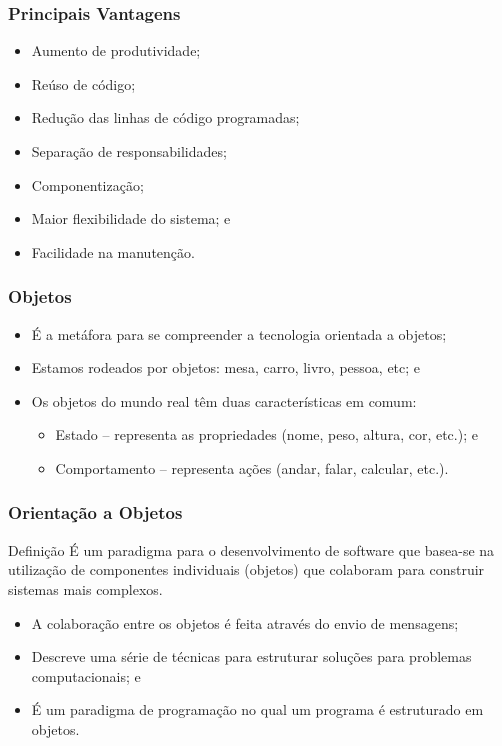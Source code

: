 \documentclass{beamer}
\begin{document}
\begin{frame}
	\frametitle{Principais Vantagens}
	
	\begin{itemize}
		\item Aumento de produtividade;
		\item Reúso de código;
		\item Redução das linhas de código programadas;
		\item Separação de responsabilidades;
		\item Componentização;
		\item Maior flexibilidade do sistema; e
		\item Facilidade na manutenção.
	\end{itemize}
\end{frame}

\begin{frame}
	\frametitle{Objetos}
	
	\begin{itemize}
		\item É a metáfora para se compreender a tecnologia orientada a objetos;
		\item Estamos rodeados por objetos: mesa, carro, livro, pessoa, etc; e
		\item Os objetos do mundo real têm duas características em comum:
		\begin{itemize}
			\item Estado -- representa as propriedades (nome, peso, altura, cor, etc.); e
			\item Comportamento -- representa ações (andar, falar, calcular, etc.).
		\end{itemize}
	\end{itemize}
\end{frame}


\begin{frame}
	\frametitle{Orientação a Objetos}

	\begin{block}{Definição}
		É um paradigma para o desenvolvimento de software que basea-se na utilização de componentes individuais (objetos) que colaboram para construir sistemas mais complexos. 
	\end{block}\vfill
	
	\begin{itemize}
	  \item A colaboração entre os objetos é feita através do envio de mensagens;
	  \item Descreve uma série de técnicas para estruturar soluções para problemas
	  computacionais; e
	  \item É um paradigma de programação no qual um programa é estruturado em
	  objetos.
	\end{itemize}
\end{frame}
\end{document}
